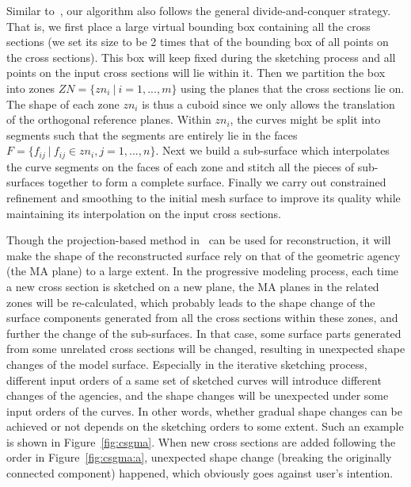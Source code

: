 Similar to~\cite{LBDLJ08}, our algorithm also  follows the general
divide-and-conquer strategy. That is, we first place a large virtual
bounding box containing all the cross sections (we set its size to be 2 times
that of the bounding box of all points on the cross sections). This box will keep
fixed during the sketching process and all points on the input cross
sections will lie within it. Then we partition the box into zones
$ZN=\{zn_i~|~i=1,...,m\}$ using the planes that the cross sections
lie on. The shape of each zone $zn_i$ is thus a cuboid since we only
allows the translation of the orthogonal reference planes. Within
$zn_i$, the curves might be split into segments such that the segments
are entirely lie in the faces $F=\{f_{ij}~|~f_{ij}\in
zn_i,j=1,...,n\}$. Next we build a sub-surface which interpolates
the curve segments on the faces of each zone and stitch all the
pieces of sub-surfaces together to form a complete surface. Finally
we carry out constrained refinement and smoothing to the initial
mesh surface to improve its quality while maintaining its
interpolation on the input cross sections.

Though the projection-based method in~\cite{LBDLJ08} can be used for
reconstruction, it will make the shape of the reconstructed surface
rely on that of the geometric agency (the MA plane) to a large
extent. In the progressive modeling process, each time a new cross
section is sketched on a new plane, the MA planes in the related
zones will be re-calculated, which probably leads to the shape
change of the surface components generated from all the cross
sections within these zones, and further the change of the
sub-surfaces. In that case, some surface parts generated from some
unrelated cross sections will be changed, resulting in unexpected
shape changes of the model surface. Especially in the iterative
sketching process, different input orders of a same set of sketched
curves will introduce different changes of the agencies, and the
shape changes will be unexpected under some input orders of the
curves. In other words, whether gradual shape changes can be
achieved or not depends on the sketching orders to some extent. Such
an example is shown in Figure~\ref{fig:csgma}. When new cross
sections are added following the order in Figure~\ref{fig:csgma:a},
unexpected shape change (breaking the originally connected
component) happened, which obviously goes against user's intention.

